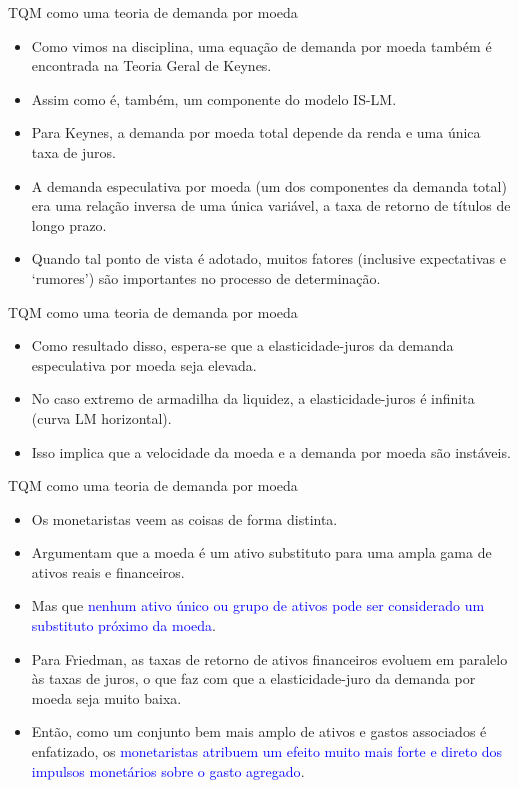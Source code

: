 \documentclass[10pt]{beamer}
\begin{document}
\begin{frame}{TQM como uma teoria de demanda por moeda}
    \begin{itemize}
        \item Como vimos na disciplina, uma equação de demanda por moeda também é encontrada na Teoria Geral de Keynes.
        \bigskip
        \item Assim como é, também, um componente do modelo IS-LM.
        \bigskip
        \item Para Keynes, a demanda por moeda total depende da renda e uma única taxa de juros.
        \bigskip
        \item A demanda especulativa por moeda (um dos componentes da demanda total) era uma relação inversa de uma única variável, a taxa de retorno de títulos de longo prazo.
        \bigskip
        \item Quando tal ponto de vista é adotado, muitos fatores (inclusive expectativas e `rumores') são importantes no processo de determinação.
    \end{itemize}
\end{frame}

\begin{frame}{TQM como uma teoria de demanda por moeda}
    \begin{itemize}
        \item Como resultado disso, espera-se que a elasticidade-juros da demanda especulativa por moeda seja elevada.
        \bigskip
        \item No caso extremo de armadilha da liquidez, a elasticidade-juros é infinita (curva LM horizontal).
        \bigskip
        \item Isso implica que a velocidade da moeda e a demanda por moeda são instáveis.
    \end{itemize}
\end{frame}

\begin{frame}{TQM como uma teoria de demanda por moeda}
    \begin{itemize}
        \item Os monetaristas veem as coisas de forma distinta.
        \bigskip
        \item Argumentam que a moeda é um ativo substituto para uma ampla gama de ativos reais e financeiros.
        \bigskip
        \item Mas que \textcolor{blue}{nenhum ativo único ou grupo de ativos pode ser considerado um substituto próximo da moeda}.
        \bigskip
        \item Para Friedman, as taxas de retorno de ativos financeiros evoluem em paralelo às taxas de juros, o que faz com que a elasticidade-juro da demanda por moeda seja muito baixa.
        \bigskip
        \item Então, como um conjunto bem mais amplo de ativos e gastos associados é enfatizado, os \textcolor{blue}{monetaristas atribuem um efeito muito mais forte e direto dos impulsos monetários sobre o gasto agregado}.
    \end{itemize}
\end{frame}
\end{document}
